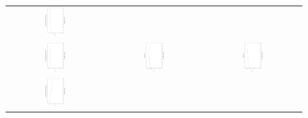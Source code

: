 \begin{figure}[t]
\begin{tabular}{ccc}
\includegraphics[width=0.22\textwidth, angle=-90,origin=c]{Tuning/3obj_WFG8.eps} \\
\includegraphics[width=0.22\textwidth, angle=-90,origin=c]{Tuning/2obj_WFG9.eps} &
\includegraphics[width=0.22\textwidth, angle=-90,origin=c]{Tuning/UF5.eps} &
\includegraphics[width=0.22\textwidth, angle=-90,origin=c]{Tuning/UF6.eps} \\
\includegraphics[width=0.22\textwidth, angle=-90,origin=c]{Tuning/3obj_WFG9.eps} &

\end{tabular}
\end{figure}
